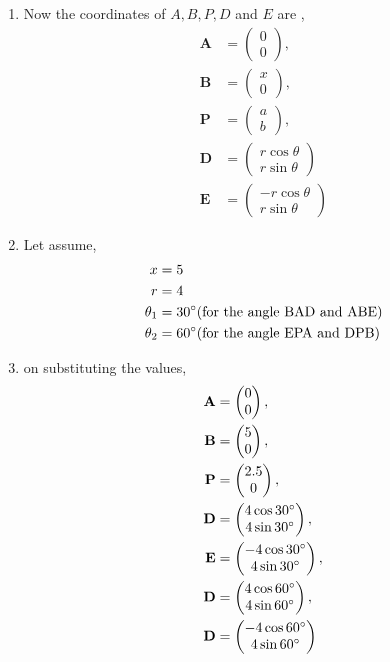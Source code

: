 \documentclass[11pt, a4paper]{article}
\newcommand{\myvec}[1]{\ensuremath{\begin{pmatrix}#1\end{pmatrix}}}
\let\vec\mathbf
\begin{document}
\begin{enumerate}
\begin{enumerate}[label=(\roman*)]
\item Now the coordinates of $A,B,P,D$ and $E$ are ,
\begin{align}
\vec{A} &= \myvec{0 \\ 0},\\
\vec{B} &= \myvec{x \\ 0} ,\\
\vec{P} &= \myvec{a \\ b} ,\\
\vec{D} &= \myvec{r \cos \theta \\ r \sin \theta} \\
\vec{E} &= \myvec{-r \cos \theta \\ r \sin \theta} 
\end{align}

\item Let assume, 
\begin{align}
	x &= 5 \\
	r &=4 \\
	\theta_1 &= 30\degree(\text{for the angle BAD and ABE})\\
	\theta_2 &= 60\degree(\text{for the angle EPA and DPB})
\end{align}

\item on substituting the values,
\begin{align}
\vec{A} &= \myvec{0 \\ 0},\\
\vec{B} &= \myvec{5 \\ 0} ,\\
\vec{P} &= \myvec{2.5 \\ 0} ,\\
\vec{D} &= \myvec{4 \cos 30 \degree \\ 4 \sin 30 \degree },\\
\vec{E} &= \myvec{-4 \cos 30 \degree \\ 4 \sin 30 \degree },\\
\vec{D} &= \myvec{4 \cos 60 \degree \\ 4 \sin 60 \degree } ,\\
\vec{D} &= \myvec{-4 \cos 60 \degree \\ 4 \sin 60 \degree } 
\end{align}


\end{enumerate}
\end{enumerate}
\end{document}
